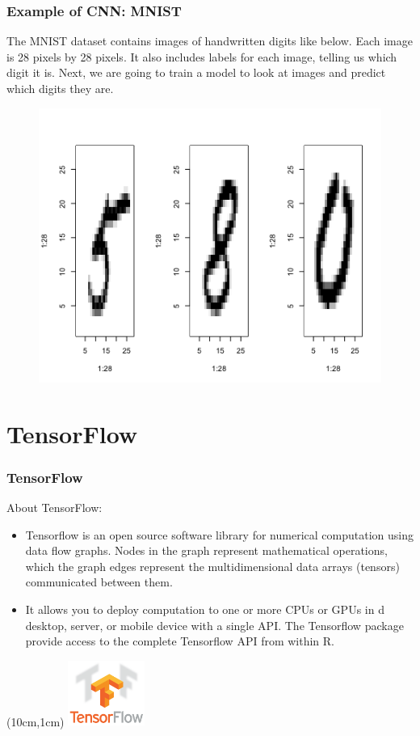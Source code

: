 \documentclass{beamer}
\begin{document}
\begin{frame}
	\frametitle{Example of CNN: MNIST}
	The MNIST dataset contains images of handwritten digits like below. Each image is 28 pixels by 28 pixels. It also includes labels for each image, telling us which digit it is. Next, we are going to train a model to look at images and predict which digits they are.
	\begin{figure}
		\includegraphics[width=0.55\linewidth]{MNIST1}
	\end{figure}
\end{frame}

\section{TensorFlow}
\begin{frame}
	\frametitle{TensorFlow}
	
\vspace{0.5in}
About TensorFlow:
\begin{itemize}
	\item Tensorflow is an open source software library for numerical computation using data flow graphs. Nodes in the graph represent mathematical operations, which the graph edges represent the multidimensional data arrays (tensors) communicated between them. 
	\item It allows you to deploy computation to one or more CPUs or GPUs in d desktop, server, or mobile device with a single API. The Tensorflow package provide access to the complete Tensorflow API from within R. 
\end{itemize}
	\begin{textblock*}{5cm}(10cm,1cm) %
		\includegraphics[width=2.5cm]{tensorflow_logo}
	\end{textblock*}
\end{frame}
\end{document}
